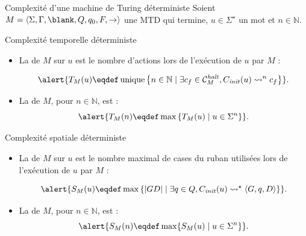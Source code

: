 
\begingroup

\begin{frame}{Complexité d'une machine de Turing déterministe}
  Soient $M=\langle \Sigma, \Gamma, \blank, Q, q_0, F, \rightarrow \rangle$ une MTD qui termine, $u \in \Sigma^\star$ un mot et $n\in \mathbb{N}$.

  \begin{block}{Complexité temporelle déterministe}
    \begin{itemize}
    \item\vspace{-1mm} La  de $M$ sur $u$ est le \alert{nombre d'actions} lors de l'exécution de $u$ par $M$ :

      \vspace{-2mm}
      $$\alert{T_M(u) \eqdef \operatorname{unique}\left\{n \in \mathbb{N} \mid \exists c_f \in \mathcal{C}_M^\mathit{halt}, C_{\mathit{init}}(u) \leadsto^n c_f\right\}}.$$ 

    \item\vspace{-1mm} La  de $M$, pour $n\in \mathbb{N}$, est : \\

      \vspace{-2mm}
      $$\alert{T_M(n) \eqdef \max \left\{T_M(u) \mid u \in \Sigma^n \right\}}.$$ 
    \end{itemize}
  \end{block}

  \vspace{-2mm}
  \begin{block}{Complexité spatiale déterministe}
    \begin{itemize}
    \item\vspace{-1mm} La  de $M$ sur $u$ est le \alert{nombre maximal de cases du ruban utilisées} lors de l'exécution de $u$ par $M$ :

      \vspace{-2mm}
      $$\alert{S_M(u) \eqdef \max\left\{|GD| \mid \exists q\in Q, C_{\mathit{init}}(u) \leadsto^\star \langle G, q, D \rangle \right\}}.$$ 

      
    \item\vspace{-1mm} La  de $M$, pour $n\in \mathbb{N}$, est : \\

      \vspace{-2mm}
      $$\alert{S_M(n) \eqdef \max \{S_M(u) \mid u \in \Sigma^n \}}.$$ 
    \end{itemize}
  \end{block}

\end{frame}

\endgroup
\endinput
